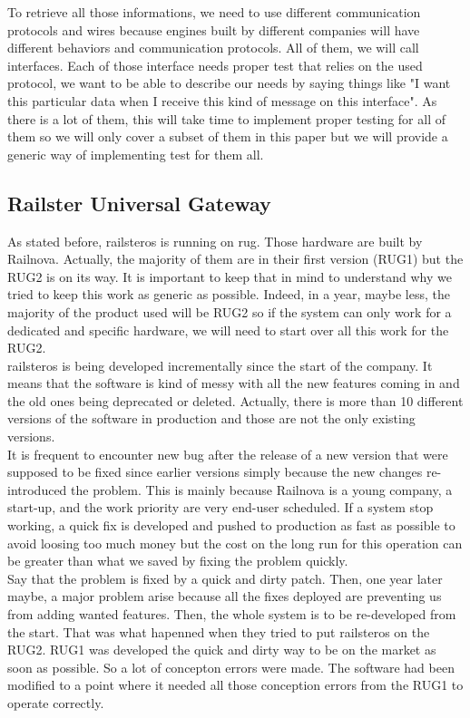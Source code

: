 \documentclass[12pt]{article}
\begin{document}
To retrieve all those informations, we need to use different communication protocols and wires because engines built by different companies will have different behaviors and communication protocols. All of them, we will call interfaces. Each of those interface needs proper test that relies on the used protocol, we want to be able to describe our needs by saying things like "I want this particular data when I receive this kind of message on this interface". As there is a lot of them, this will take time to implement proper testing for all of them so we will only cover a subset of them in this paper but we will provide a generic way of implementing test for them all.

\subsection{Railster Universal Gateway}

As stated before, \gls{railsteros} is running on \gls{rug}. Those hardware are built by Railnova. Actually, the majority of them are in their first version (RUG1) but the RUG2 is on its way. It is important to keep that in mind to understand why we tried to keep this work as generic as possible. Indeed, in a year, maybe less, the majority of the product used will be RUG2 so if the system can only work for a dedicated and specific hardware, we will need to start over all this work for the RUG2.\\

\gls{railsteros} is being developed incrementally since the start of the company. It means that the software is kind of messy with all the new features coming in and the old ones being deprecated or deleted. Actually, there is more than 10 different versions of the software in production and those are not the only existing versions.\\

It is frequent to encounter new bug after the release of a new version that were supposed to be fixed since earlier versions simply because the new changes re-introduced the problem. This is mainly because Railnova is a young company, a start-up, and the work priority are very end-user scheduled. If a system stop working, a quick fix is developed and pushed to production as fast as possible to avoid loosing too much money but the cost on the long run for this operation can be greater than what we saved by fixing the problem quickly.\\

Say that the problem is fixed by a quick and dirty patch. Then, one year later maybe, a major problem arise because all the fixes deployed are preventing us from adding wanted features. Then, the whole system is to be re-developed from the start. That was what hapenned when they tried to put \gls{railsteros} on the RUG2. RUG1 was developed the quick and dirty way to be on the market as soon as possible. So a lot of concepton errors were made. The software had been modified to a point where it needed all those conception errors from the RUG1 to operate correctly.\\
\end{document}
